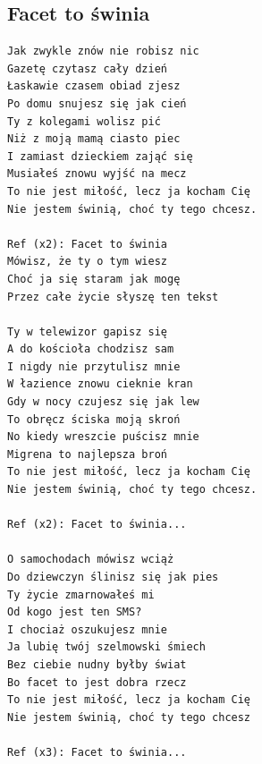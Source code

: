 \documentclass[12pt]{article}
\begin{document}
\subsection*{Facet to świnia}
\begin{verbatim}
Jak zwykle znów nie robisz nic
Gazetę czytasz cały dzień
Łaskawie czasem obiad zjesz
Po domu snujesz się jak cień
Ty z kolegami wolisz pić
Niż z moją mamą ciasto piec
I zamiast dzieckiem zająć się
Musiałeś znowu wyjść na mecz
To nie jest miłość, lecz ja kocham Cię
Nie jestem świnią, choć ty tego chcesz.

Ref (x2): Facet to świnia
Mówisz, że ty o tym wiesz
Choć ja się staram jak mogę
Przez całe życie słyszę ten tekst

Ty w telewizor gapisz się
A do kościoła chodzisz sam
I nigdy nie przytulisz mnie
W łazience znowu cieknie kran
Gdy w nocy czujesz się jak lew
To obręcz ściska moją skroń
No kiedy wreszcie puścisz mnie
Migrena to najlepsza broń
To nie jest miłość, lecz ja kocham Cię
Nie jestem świnią, choć ty tego chcesz.

Ref (x2): Facet to świnia...

O samochodach mówisz wciąż
Do dziewczyn ślinisz się jak pies
Ty życie zmarnowałeś mi
Od kogo jest ten SMS?
I chociaż oszukujesz mnie
Ja lubię twój szelmowski śmiech
Bez ciebie nudny byłby świat
Bo facet to jest dobra rzecz
To nie jest miłość, lecz ja kocham Cię
Nie jestem świnią, choć ty tego chcesz

Ref (x3): Facet to świnia...
\end{verbatim}
\clearpage
\end{document}
